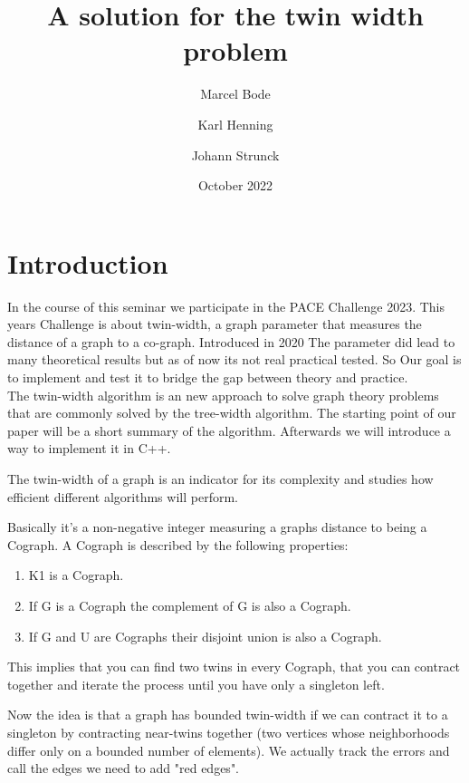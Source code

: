 \documentclass[acmsmall,review]{acmart}
\date{October 2022}
\title{A solution for the twin width problem}
\author{Marcel Bode}
\author{Karl Henning}
\author{Johann Strunck}
\begin{document}
\maketitle

\section{Introduction}

In the course of this seminar we participate in the PACE Challenge 2023. This years
Challenge is about twin-width, a graph parameter that measures the distance of a graph to
a co-graph. Introduced in 2020 The parameter did lead to many theoretical results but as
of now its not real practical tested. So Our goal is to implement and test it to bridge
the gap between theory and practice. \\ The twin-width algorithm is an new approach to
solve graph theory problems that are commonly solved by the tree-width algorithm. The
starting point of our paper will be a short summary of the algorithm. Afterwards we will
introduce a way to implement it in C++.%

The twin-width of a graph is an indicator for its complexity and studies how efficient
different algorithms will perform.

Basically it's a non-negative integer measuring a graphs distance to being a Cograph. A
Cograph is described by the following properties:

\begin{enumerate}
    \item K1 is a Cograph.
    \item If G is a Cograph the complement of G is also a Cograph.
    \item If G and U are Cographs their disjoint union is also a Cograph.
\end{enumerate}

This implies that you can find two twins in every Cograph, that you can contract together
and iterate the process until you have only a singleton left.

Now the idea is that a graph has bounded twin-width if we can contract it to a singleton
by contracting near-twins together (two vertices whose neighborhoods differ only on a
bounded number of elements). We actually track the errors and call the edges we need to
add "red edges".
\end{document}
